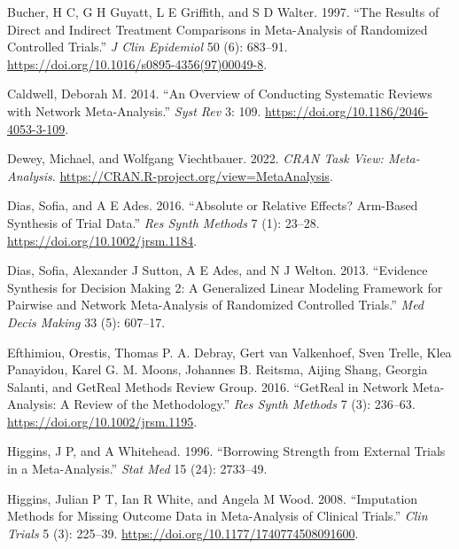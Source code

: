 \hypertarget{refs}{}
\begin{CSLReferences}{1}{0}
\leavevmode{}%
Bucher, H C, G H Guyatt, L E Griffith, and S D Walter. 1997. {``The Results of Direct and Indirect Treatment Comparisons in Meta-Analysis of Randomized Controlled Trials.''} \emph{J Clin Epidemiol} 50 (6): 683--91. \url{https://doi.org/10.1016/s0895-4356(97)00049-8}.

\leavevmode{}%
Caldwell, Deborah M. 2014. {``An Overview of Conducting Systematic Reviews with Network Meta-Analysis.''} \emph{Syst Rev} 3: 109. \url{https://doi.org/10.1186/2046-4053-3-109}.

\leavevmode{}%
Dewey, Michael, and Wolfgang Viechtbauer. 2022. \emph{{CRAN Task View}: Meta-Analysis}. \url{https://CRAN.R-project.org/view=MetaAnalysis}.

\leavevmode{}%
Dias, Sofia, and A E Ades. 2016. {``Absolute or Relative Effects? Arm-Based Synthesis of Trial Data.''} \emph{Res Synth Methods} 7 (1): 23--28. \url{https://doi.org/10.1002/jrsm.1184}.

\leavevmode{}%
Dias, Sofia, Alexander J Sutton, A E Ades, and N J Welton. 2013. {``Evidence Synthesis for Decision Making 2: A Generalized Linear Modeling Framework for Pairwise and Network Meta-Analysis of Randomized Controlled Trials.''} \emph{Med Decis Making} 33 (5): 607--17.

\leavevmode{}%
Efthimiou, Orestis, Thomas P. A. Debray, Gert van Valkenhoef, Sven Trelle, Klea Panayidou, Karel G. M. Moons, Johannes B. Reitsma, Aijing Shang, Georgia Salanti, and GetReal Methods Review Group. 2016. {``GetReal in Network Meta-Analysis: A Review of the Methodology.''} \emph{Res Synth Methods} 7 (3): 236--63. \url{https://doi.org/10.1002/jrsm.1195}.

\leavevmode{}%
Higgins, J P, and A Whitehead. 1996. {``Borrowing Strength from External Trials in a Meta-Analysis.''} \emph{Stat Med} 15 (24): 2733--49.

\leavevmode{}%
Higgins, Julian P T, Ian R White, and Angela M Wood. 2008. {``Imputation Methods for Missing Outcome Data in Meta-Analysis of Clinical Trials.''} \emph{Clin Trials} 5 (3): 225--39. \url{https://doi.org/10.1177/1740774508091600}.


\end{CSLReferences}
